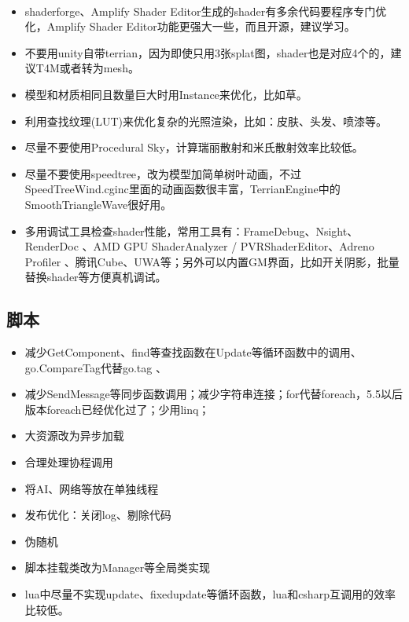 \documentclass[9pt, b5paper]{article}
\begin{document}
\begin{itemize}
$$\item shaderforge、Amplify Shader Editor生成的shader有多余代码要程序专门优化，Amplify Shader Editor功能更强大一些，而且开源，建议学习。
\item 不要用unity自带terrian，因为即使只用3张splat图，shader也是对应4个的，建议T4M或者转为mesh。
\item 模型和材质相同且数量巨大时用Instance来优化，比如草。
\item 利用查找纹理(LUT)来优化复杂的光照渲染，比如：皮肤、头发、喷漆等。
\item 尽量不要使用Procedural Sky，计算瑞丽散射和米氏散射效率比较低。
\item 尽量不要使用speedtree，改为模型加简单树叶动画，不过SpeedTreeWind.cginc里面的动画函数很丰富，TerrianEngine中的SmoothTriangleWave很好用。
\item 多用调试工具检查shader性能，常用工具有：FrameDebug、Nsight、RenderDoc 、AMD GPU ShaderAnalyzer / PVRShaderEditor、Adreno Profiler 、腾讯Cube、UWA等；另外可以内置GM界面，比如开关阴影，批量替换shader等方便真机调试。
\end{itemize}
\subsection{脚本}
\label{sec-5-2}
\begin{itemize}
\item 减少GetComponent、find等查找函数在Update等循环函数中的调用、go.CompareTag代替go.tag 、
\item 减少SendMessage等同步函数调用；减少字符串连接；for代替foreach，5.5以后版本foreach已经优化过了；少用linq；
\item 大资源改为异步加载
\item 合理处理协程调用
\item 将AI、网络等放在单独线程
\item 发布优化：关闭log、剔除代码
\item 伪随机
\item 脚本挂载类改为Manager等全局类实现
\item lua中尽量不实现update、fixedupdate等循环函数，lua和csharp互调用的效率比较低。
\end{itemize}
\end{document}
